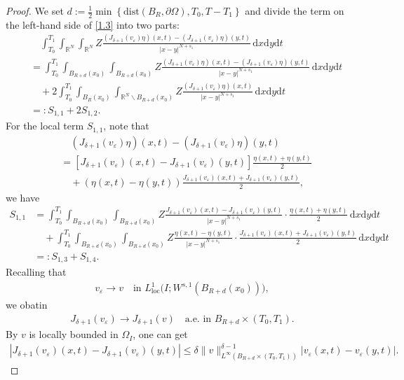 \documentclass[10pt,a4paper]{amsart}
\begin{document}
\begin{proof}
	We set $d:=\frac{1}{2}\min{\left\lbrace \mathrm{dist}\left( B_R,\partial\Omega\right) , T_0, T-T_1\right\rbrace }$ and divide the term on the left-hand side of \eqref{1.3} into two parts:
	\begin{align*}
		&\quad\int_{T_0}^{T_1}\int_{\mathbb{R}^N}\int_{\mathbb{R}^N}Z\frac{\left( J_{\delta+1}(v_\varepsilon)\eta\right) (x,t)-\left( J_{\delta+1}(v_\varepsilon)\eta\right) (y,t)}{|x-y|^{N+s_1}}\,\mathrm{d}x\mathrm{d}y\mathrm{d}t\\
		&=\int_{T_0}^{T_1}\int_{B_{R+d}(x_0)}\int_{B_{R+d}(x_0)}Z\frac{\left( J_{\delta+1}(v_\varepsilon)\eta\right) (x,t)-\left( J_{\delta+1}(v_\varepsilon)\eta\right) (y,t)}{|x-y|^{N+s_1}}\,\mathrm{d}x\mathrm{d}y\mathrm{d}t\\
		&\quad+2\int_{T_0}^{T_1}\int_{B_{R}(x_0)}\int_{\mathbb{R}^N\backslash B_{R+d}(x_0)}Z\frac{\left( J_{\delta+1}(v_\varepsilon)\eta\right)(x,t)}{|x-y|^{N+s_1}}\,\mathrm{d}x\mathrm{d}y\mathrm{d}t\\
		&=:S_{1,1}+2S_{1,2}.
	\end{align*}
	For the local term $S_{1,1}$, note that
	\begin{align*}
		&\quad\left( J_{\delta+1}(v_\varepsilon)\eta\right)(x,t)-\left( J_{\delta+1}(v_\varepsilon)\eta\right)(y,t)\\
		&=\left[ J_{\delta+1}(v_\varepsilon)(x,t)-J_{\delta+1}(v_\varepsilon)(y,t)\right]\frac{\eta(x,t)+\eta(y,t)}{2}\\
		&\quad+\left( \eta(x,t)-\eta(y,t)\right)\frac{J_{\delta+1}(v_\varepsilon)(x,t)+J_{\delta+1}(v_\varepsilon)(y,t)}{2},
	\end{align*}
	we have
	\begin{align*}
		S_{1,1}&=\int_{T_0}^{T_1}\int_{B_{R+d}(x_0)}\int_{B_{R+d}(x_0)}Z\frac{J_{\delta+1}(v_\varepsilon)(x,t)-J_{\delta+1}(v_\varepsilon)(y,t)}{|x-y|^{N+s_1}}\cdot\frac{\eta(x,t)+\eta(y,t)}{2}\,\mathrm{d}x\mathrm{d}y\mathrm{d}t\\
		&\quad+\int_{T_0}^{T_1}\int_{B_{R+d}(x_0)}\int_{B_{R+d}(x_0)}Z\frac{\eta(x,t)-\eta(y,t)}{|x-y|^{N+s_1}}\cdot\frac{J_{\delta+1}(v_\varepsilon)(x,t)+J_{\delta+1}(v_\varepsilon)(y,t)}{2}\,\mathrm{d}x\mathrm{d}y\mathrm{d}t\\
		&=:S_{1,3}+S_{1,4}.
	\end{align*}
	Recalling that
	\begin{align*}
		v_\varepsilon\rightarrow v\quad\text{in }  L^1_{\mathrm{loc}}\bigl(I; W^{s,1}\left(B_{R+d}(x_0)\right)\bigl),
	\end{align*}
	we obatin
	\begin{align}
		\label{1.5}
		J_{\delta+1}(v_\varepsilon)\rightarrow J_{\delta+1}(v)\quad\text{a.e. in }B_{R+d}\times(T_0,T_1).
	\end{align}
	By $v$ is locally bounded in $\Omega_I$, one can get
	\begin{align}
		\label{1.51}
		\left| J_{\delta+1}(v_\varepsilon)(x,t)-J_{\delta+1}(v_\varepsilon)(y,t)\right|\le \delta\|v\|_{L^\infty(B_{R+d}\times(T_0,T_1))}^{\delta-1}|v_\varepsilon(x,t)-v_\varepsilon(y,t)|.
	\end{align}
	

\end{proof}
\end{document}
